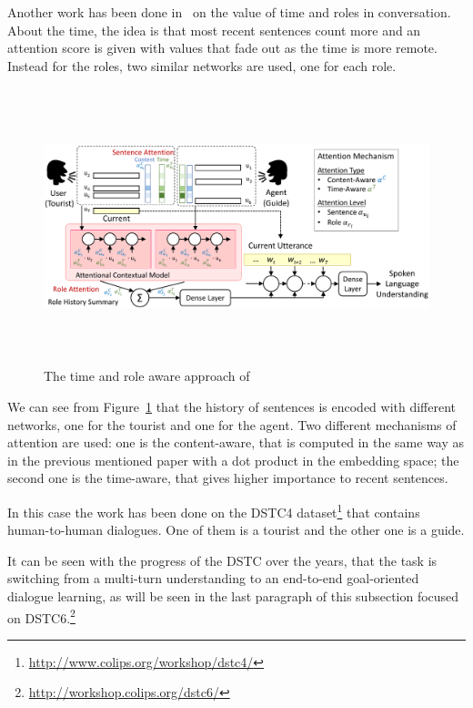 Another work has been done in~\cite{chen2017dynamic} on the value of time and roles in conversation. About the time, the idea is that most recent sentences count more and an attention score is given with values that fade out as the time is more remote. Instead for the roles, two similar networks are used, one for each role.


\begin{figure}[!htbp]
    \centering
    \includegraphics[max width=\linewidth,max height=8cm,keepaspectratio]{figures/timeRoleSLUchen}
    \caption{The time and role aware approach of~\cite{chen2017dynamic}}\label{fig:timeRoleSLUchen}
\end{figure}

We can see from Figure~\ref{fig:timeRoleSLUchen} that the history of sentences is encoded with different networks, one for the tourist and one for the agent. Two different mechanisms of attention are used: one is the content-aware, that is computed in the same way as in the previous mentioned paper with a dot product in the embedding space; the second one is the time-aware, that gives higher importance to recent sentences.

In this case the work has been done on the DSTC4 dataset\footnote{\url{http://www.colips.org/workshop/dstc4/}} that contains human-to-human dialogues. One of them is a tourist and the other one is a guide.

It can be seen with the progress of the DSTC over the years, that the task is switching from a multi-turn understanding to an end-to-end goal-oriented dialogue learning, as will be seen in the last paragraph of this subsection focused on DSTC6.\footnote{\url{http://workshop.colips.org/dstc6/}}

